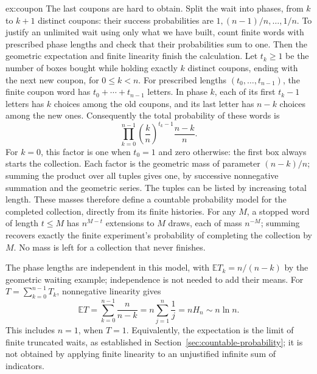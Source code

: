 \begin{solution}{ex:coupon}
\idea The last coupons are hard to obtain. Split the wait into phases, from $k$
to $k+1$ distinct coupons: their success probabilities are
$1,(n-1)/n,\ldots,1/n$. To justify an unlimited wait using only what we have
built, count finite words with prescribed phase lengths and check that their
probabilities sum to one. Then the geometric expectation and finite linearity
finish the calculation.
\writeup Let $t_k\ge1$ be the number of boxes bought while holding exactly $k$
distinct coupons, ending with the next new coupon, for $0\le k<n$.
For prescribed lengths $(t_0,\ldots,t_{n-1})$, the finite coupon word has
$t_0+\cdots+t_{n-1}$ letters. In phase $k$, each of its first $t_k-1$
letters has $k$ choices among the old coupons, and its last letter has $n-k$
choices among the new ones. Consequently the total probability of these
words is
\[
 \prod_{k=0}^{n-1}\left(\frac{k}{n}\right)^{t_k-1}\frac{n-k}{n}.
\]
For $k=0$, this factor is one when $t_0=1$ and zero otherwise: the first box
always starts the collection. Each factor is the geometric mass of parameter
$(n-k)/n$; summing the product over all tuples gives one, by successive
nonnegative summation and the geometric series. The tuples can be listed by increasing total length. These masses therefore define
a countable probability model for the completed collection, directly from its
finite histories. For any $M$, a stopped word of length $t\le M$ has
$n^{M-t}$ extensions to $M$ draws, each of mass $n^{-M}$; summing recovers
exactly the finite experiment's probability of completing the collection by
$M$. No mass is left for a collection that never finishes.

The phase lengths are independent in this model, with
$\mathbb ET_k=n/(n-k)$ by the geometric waiting example; independence is
not needed to add their means. For $T=\sum_{k=0}^{n-1}T_k$, nonnegative
linearity gives
\[
 \mathbb ET=\sum_{k=0}^{n-1}\frac{n}{n-k}
 =n\sum_{j=1}^n\frac1j=nH_n\sim n\ln n.
\]
This includes $n=1$, when $T=1$. Equivalently, the expectation is the limit of
finite truncated waits, as established in Section~\ref{sec:countable-probability};
it is not obtained by applying finite linearity to an unjustified infinite sum
of indicators.
\end{solution}

